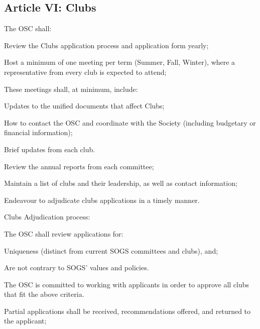 \subsection{Article VI: Clubs}
\begin{longenum}[ label*=\thesubsection.\arabic*., align=left] 
\item The OSC shall:
	\begin{longenum}[label*=\arabic*., align=left]
	\item Review the Clubs application process and application form yearly;
	\item Host a minimum of one meeting per term (Summer, Fall, Winter), where a representative from every club is expected to attend;
		\begin{longenum}[label*=\arabic*., align=left]
		\item These meetings shall, at minimum, include:
			\begin{longenum}[label*=\arabic*., align=left]
			\item Updates to the unified documents that affect Clubs;
			\item How to contact the OSC and coordinate with the Society (including budgetary or financial information);
			\item Brief updates from each club.
			\end{longenum}
		\end{longenum}
	\item Review the annual reports from each committee;
	\item Maintain a list of clubs and their leadership, as well as contact information;
	\item Endeavour to adjudicate clubs applications in a timely manner.
	\end{longenum}
\item Clubs Adjudication process:
	\begin{longenum}[label*=\arabic*., align=left]
	\item The OSC shall review applications for:
		\begin{longenum}[label*=\arabic*., align=left]
		\item Uniqueness (distinct from current SOGS committees and clubs), and;
		\item Are not contrary to SOGS' values and policies.
		\end{longenum}
	\item The OSC is committed to working with applicants in order to approve all clubs that fit the above criteria.
	\item Partial applications shall be received, recommendations offered, and returned to the applicant;

\end{longenum}
\end{longenum}
